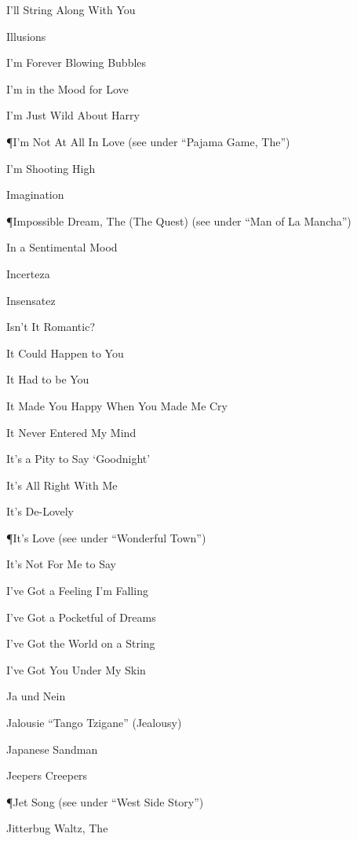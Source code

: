 \N I'll String Along With You

\N Illusions

\N I'm Forever Blowing Bubbles

\N {}

\N I'm in the Mood for Love

\N I'm Just Wild About Harry

\P I'm Not At All In Love
\nobreak
\T (see under ``Pajama Game, The'')

\N I'm Shooting High

\N Imagination

\P Impossible Dream, The (The Quest)
\nobreak
\T (see under ``Man of La Mancha'')

\N In a Sentimental Mood

\N Incerteza

\N Insensatez

\N Isn't It Romantic?

\N {}

\N It Could Happen to You

\N It Had to be You

\N It Made You Happy When You Made Me Cry

\N It Never Entered My Mind

\N It's a Pity to Say `Goodnight'

\N It's All Right With Me

\N It's De-Lovely

\P It's Love
\nobreak
\T (see under ``Wonderful Town'')

\N It's Not For Me to Say

\N I've Got a Feeling I'm Falling

\N I've Got a Pocketful of Dreams

\N I've Got the World on a String

\N I've Got You Under My Skin

\N Ja und Nein

\N Jalousie ``Tango Tzigane'' (Jealousy)

\N Japanese Sandman

\N Jeepers Creepers

\P Jet Song
\nobreak
\T (see under ``West Side Story'')

\N Jitterbug Waltz, The


